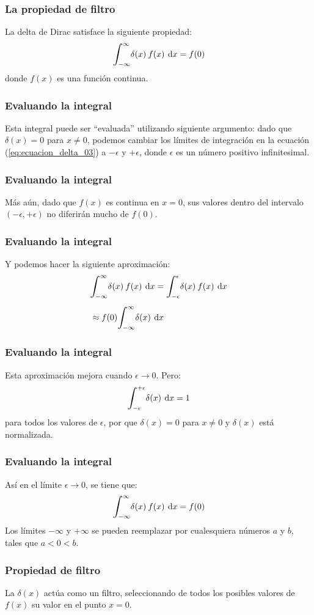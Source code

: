 \documentclass[12pt]{beamer}
\begin{document}
\begin{frame}
\frametitle{La propiedad de filtro}
La delta de Dirac satisface la siguiente propiedad:
\begin{equation}
\scaleint{6ex}_{\bs -\infty}^{\infty} \delta (x) \: f (x) \: \dd{x} = f (0)
\label{eq:ecuacion_delta_03}
\end{equation}
donde $f(x)$ es una función continua.
\end{frame}
\begin{frame}
\frametitle{Evaluando la integral}
Esta integral puede ser \enquote{evaluada} utilizando siguiente argumento: \pause dado que $\delta (x) = 0$
para $x \neq 0$, podemos cambiar los límites de integración en la ecuación (\ref{eq:ecuacion_delta_03}) a $- \epsilon$ y $+ \epsilon$, donde $\epsilon$ es un número positivo infinitesimal.
\end{frame}
\begin{frame}
\frametitle{Evaluando la integral}
Más aún, dado que $f (x)$ es continua en $x = 0$, sus valores dentro del intervalo $( - \epsilon, + \epsilon)$ no diferirán mucho de $f(0)$.
\end{frame}
\begin{frame}
\frametitle{Evaluando la integral}
Y podemos hacer la siguiente aproximación:
\pause
\begin{align*}
&\scaleint{6ex}_{\bs -\infty}^{\infty} \delta (x) \: f (x) \: \dd{x} = \scaleint{6ex}_{\bs -\epsilon}^{\epsilon} \delta (x) \: f (x) \: \dd{x} \\[0.5em]
&\approx f(0) \scaleint{6ex}_{\bs -\infty}^{\infty} \delta (x) \: \dd{x}
\end{align*}
\end{frame}
\begin{frame}
\frametitle{Evaluando la integral}
Esta aproximación mejora cuando $\epsilon \to 0$. Pero:
\pause
\begin{align*}
\scaleint{6ex}_{\bs -\epsilon}^{+\epsilon} \delta (x) \: \dd{x} = 1
\end{align*}
para todos los valores de $\epsilon$, por que $\delta (x) = 0$ para $x \neq 0$ y $\delta (x)$ está normalizada.
\end{frame}
\begin{frame}
\frametitle{Evaluando la integral}
Así en el límite $\epsilon \to 0$, se tiene que:
\pause
\begin{align*}
\scaleint{6ex}_{\bs -\infty}^{\infty} \delta (x) \: f (x) \: \dd{x} = f(0)
\end{align*}
 Los límites $-\infty$ y $+\infty$ se pueden reemplazar por cualesquiera números $a$ y $b$, tales que $a < 0 < b$.
\end{frame}
\begin{frame}
\frametitle{Propiedad de filtro}
La $\delta (x)$ actúa como un filtro, seleccionando de todos los posibles valores de $f (x)$ su valor en el punto $x = 0$.
\end{frame}
\end{document}
